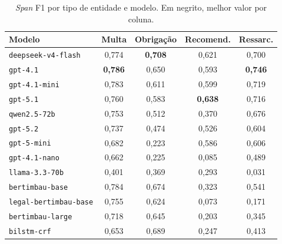 \begin{table}[ht]
    \centering
    \caption{\textit{Span} F1 por tipo de entidade e modelo. Em negrito, melhor valor por coluna.}
    \label{tab:f1_entidade}
    \small
    \begin{tabular}{lcccc}
        \hline
        \textbf{Modelo} & \textbf{Multa} & \textbf{Obrigação} & \textbf{Recomend.} & \textbf{Ressarc.} \\
        \hline
        \texttt{deepseek-v4-flash}     & 0,774 & \textbf{0,708} & 0,621 & 0,700 \\
        \texttt{gpt-4.1}               & \textbf{0,786} & 0,650 & 0,593 & \textbf{0,746} \\
        \texttt{gpt-4.1-mini}          & 0,783 & 0,611 & 0,599 & 0,719 \\
        \texttt{gpt-5.1}               & 0,760 & 0,583 & \textbf{0,638} & 0,716 \\
        \texttt{qwen2.5-72b}           & 0,753 & 0,512 & 0,370 & 0,676 \\
        \texttt{gpt-5.2}               & 0,737 & 0,474 & 0,526 & 0,604 \\
        \texttt{gpt-5-mini}            & 0,682 & 0,223 & 0,586 & 0,606 \\
        \texttt{gpt-4.1-nano}          & 0,662 & 0,225 & 0,085 & 0,489 \\
        \texttt{llama-3.3-70b}         & 0,401 & 0,369 & 0,293 & 0,031 \\
        \texttt{bertimbau-base}        & 0,784 & 0,674 & 0,323 & 0,541 \\
        \texttt{legal-bertimbau-base}  & 0,755 & 0,624 & 0,073 & 0,171 \\
        \texttt{bertimbau-large}       & 0,718 & 0,645 & 0,203 & 0,345 \\
        \texttt{bilstm-crf}            & 0,653 & 0,689 & 0,247 & 0,413 \\
        \hline
    \end{tabular}
\end{table}

